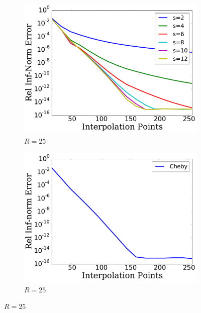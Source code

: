 
\begin{figure}[p]
    \centering
    \begin{subfigure}{0.45\textwidth}
    \includegraphics[width=\textwidth]{plots/msn_1d_smooth_R_25.pdf}
    \caption{$R=25$}
    \end{subfigure}
    \begin{subfigure}{0.45\textwidth}
    \includegraphics[width=\textwidth]{plots/cheby_1d_smooth_R_25.pdf}
    \caption{$R=25$}
    \end{subfigure}


\end{figure}

